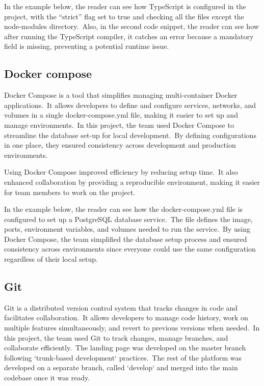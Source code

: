 In the example below, the reader can see how TypeScript is configured in the project, with the ``strict'' flag set to true and checking all the files except the node-modules directory.\ Also, in the second code snippet, the reader can see how after running the TypeScript compiler, it catches an error because a mandatory field is missing, preventing a potential runtime issue.



\subsection{Docker compose}\label{subsec:docker-compose}

Docker Compose is a tool that simplifies managing multi-container Docker applications.\ It allows developers to define and configure services, networks, and volumes in a single docker-compose.yml file, making it easier to set up and manage environments.\ In this project, the team used Docker Compose to streamline the database set-up for local development.\ By defining configurations in one place, they ensured consistency across development and production environments.\cite[Docker Compose]{dockerCompose}

Using Docker Compose improved efficiency by reducing setup time.\ It also enhanced collaboration by providing a reproducible environment, making it easier for team members to work on the project.

In the example below, the reader can see how the docker-compose.yml file is configured to set up a PostgreSQL database service.\ The file defines the image, ports, environment variables, and volumes needed to run the service.\ By using Docker Compose, the team simplified the database setup process and ensured consistency across environments since everyone could use the same configuration regardless of their local setup.



\subsection{Git}\label{subsec:git}

Git is a distributed version control system that tracks changes in code and facilitates collaboration.\ It allows developers to manage code history, work on multiple features simultaneously, and revert to previous versions when needed.\ In this project, the team used Git to track changes, manage branches, and collaborate efficiently.\ The landing page was developed on the master branch following `trunk-based development` practices.\ The rest of the platform was developed on a separate branch, called `develop` and merged into the main codebase once it was ready.\cite[Git]{git}

